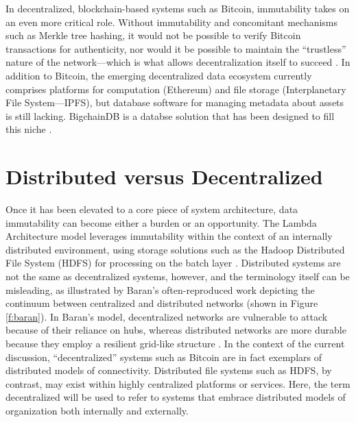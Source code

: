 \documentclass[sigconf]{acmart}
\begin{document}
In decentralized, blockchain-based systems such as Bitcoin, immutability takes on an even more critical role. Without immutability and concomitant mechanisms such as Merkle tree hashing, it would not be possible to verify Bitcoin transactions for authenticity, nor would it be possible to maintain the ``trustless'' nature of the network---which is what allows decentralization itself to succeed \cite{aA17}. In addition to Bitcoin, the emerging decentralized data ecosystem currently comprises platforms for computation (Ethereum) and file storage (Interplanetary File System---IPFS), but database software for managing metadata about assets is still lacking. BigchainDB is a databse solution that has been designed to fill this niche \cite{bigDB16, tMBI15}.

\section{Distributed versus Decentralized}
Once it has been elevated to a core piece of system architecture, data immutability can become either a burden or an opportunity. The Lambda Architecture model leverages immutability within the context of an internally distributed environment, using storage solutions such as the Hadoop Distributed File System (HDFS) for processing on the batch layer \cite{nM15}. Distributed systems are not the same as decentralized systems, however, and the terminology itself can be misleading, as illustrated by Baran's often-reproduced work depicting the continuum between centralized and distributed networks (shown in Figure \ref{f:baran}). In Baran's model, decentralized networks are vulnerable to attack because of their reliance on hubs, whereas distributed networks are more durable because they employ a resilient grid-like structure \cite{pB64}. In the context of the current discussion, ``decentralized'' systems such as Bitcoin are in fact exemplars of distributed models of connectivity. Distributed file systems such as HDFS, by contrast, may exist within highly centralized platforms or services. Here, the term decentralized will be used to refer to systems that embrace distributed models of organization both internally and externally. 
\end{document}
